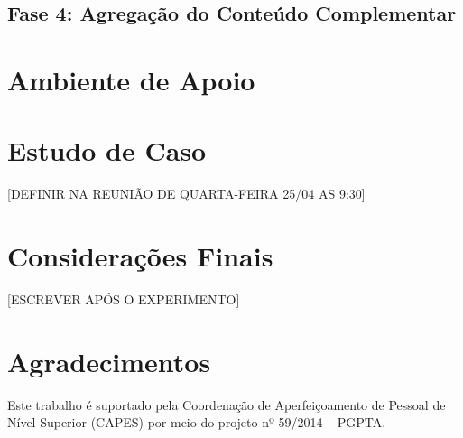 \documentclass[12pt]{article}
\begin{document}
\subsection{Fase 4: Agregação do Conteúdo Complementar}


\section{Ambiente de Apoio}


\section{Estudo de Caso}
[DEFINIR NA REUNIÃO DE QUARTA-FEIRA 25/04 AS 9:30]

\section{Considerações Finais}
[ESCREVER APÓS O EXPERIMENTO]

\section{Agradecimentos}
Este trabalho é suportado pela Coordenação de Aperfeiçoamento de Pessoal de Nível Superior (CAPES) por meio do projeto nº 59/2014 – PGPTA.




\end{document}
